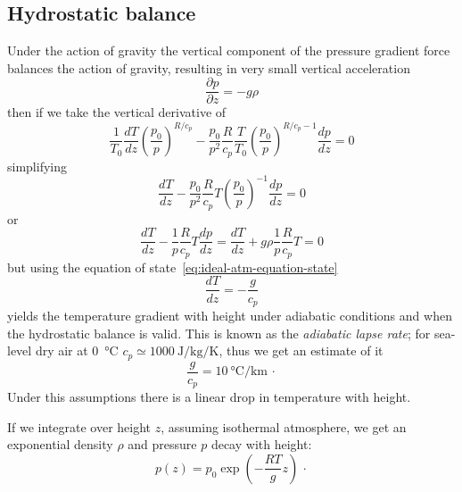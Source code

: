 \subsection{Hydrostatic balance}\label{subsec:hydrostatic-balance}
Under the action of gravity the vertical component of the pressure
gradient force balances the action of gravity, resulting in very small
vertical acceleration
\[
	\frac{\partial p}{\partial z} =  -g \rho
\]
then if we take the vertical derivative of~\eq{\ref{eq:T-T0-adiabatic}}
\[
	\frac{1}{T_0}\frac{d T}{dz}\left(\frac{p_0}{p}\right)^{R/c_p} -\frac{p_0}{p^2}\frac{R}{c_p}\frac{T}{T_0}\left(\frac{p_0}{p}\right)^{R/c_p-1}\frac{d p}{dz} = 0
\]
simplifying
\[
	\frac{d T}{dz} -\frac{p_0}{p^2}\frac{R}{c_p}T\left(\frac{p_0}{p}\right)^{-1}\frac{d p}{dz} = 0
\]
or
\[
	\frac{d T}{dz} -\frac{1}{p}\frac{R}{c_p}T\frac{d p}{dz} = \frac{d T}{dz} +g\rho\frac{1}{p}\frac{R}{c_p}T = 0
\]
but using the equation of state~\ref{eq:ideal-atm-equation-state}
\begin{equation}
	\frac{d T}{dz} = -\frac{g}{c_p}
	\label{eq:adiabatic-lapse-rate}
\end{equation}
yields the temperature gradient with height under adiabatic
conditions and when the hydrostatic balance is valid.
This is known as the \emph{adiabatic lapse rate}; for sea-level dry air at \qty{0}{\celsius} $c_p \simeq \qty{1000}{\joule \per \kilo\gram \per \kelvin}$, thus we
get an estimate of it
\begin{equation}
	\frac{g}{c_p} = \qty{10}{\celsius \per \kilo\meter} \, \cdot
	\label{eq:adiabatic-lapse-rate-value}
\end{equation}
Under this assumptions there is a linear drop in temperature with height.

If we integrate over height $z$, assuming isothermal atmosphere, we get an exponential density $\rho$ and pressure $p$ decay
with height:
\begin{equation}
	p(z)=p_0 \exp{\left(- \frac{RT}{g}z\right)} \, \cdot
	\label{eq:pressure-profile-isothermal-atm}
\end{equation}


